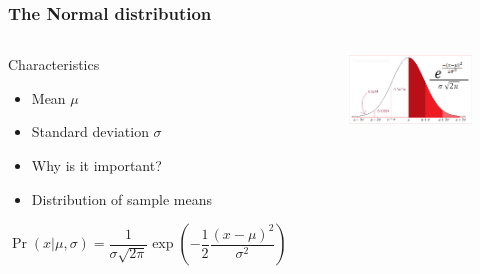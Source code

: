 \documentclass[10pt, compress]{beamer}
\begin{document}
\begin{frame}
    \frametitle{The Normal distribution}
    \begin{columns}
        \begin{block}{Characteristics}
            \begin{itemize}
                \item Mean $\mu$
                \item Standard deviation $\sigma$
                \item \alert{Why is it important?}
                \item Distribution of sample means
            \end{itemize}
            \smallskip
            \begin{equation}
                \Pr(x|\mu,\sigma)  = \frac{1}{\sigma\sqrt{2\pi}}
                    \exp\left(-\frac{1}{2}\frac{(x-\mu)^2}{\sigma^2}\right)
            \end{equation}
        \end{block}
        \begin{block}{}
            \begin{figure}
                \begin{center}
                    \includegraphics[scale=0.4]{img/normal-curve.png}
                \end{center}
            \end{figure}
        \end{block}
    \end{columns}
\end{frame}
\end{document}
